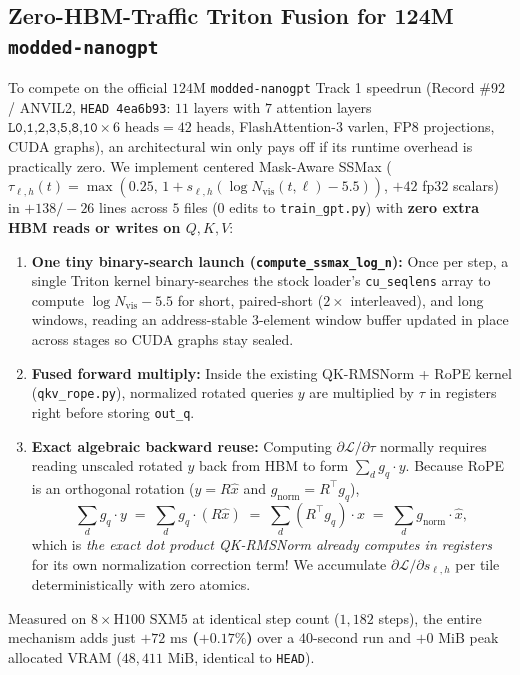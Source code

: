 \documentclass[10pt]{article}
\newcommand{\nvis}{N_{\mathrm{vis}}}
\begin{document}
\subsection{Zero-HBM-Traffic Triton Fusion for 124M \texttt{modded-nanogpt}}

To compete on the official $124\text{M}$ \texttt{modded-nanogpt} Track 1 speedrun (Record \#92 / ANVIL2, \texttt{HEAD 4ea6b93}: $11$ layers with $7$ attention layers $\texttt{L0,1,2,3,5,8,10} \times 6\text{ heads} = 42$ heads, FlashAttention-3 varlen, FP8 projections, CUDA graphs), an architectural win only pays off if its runtime overhead is practically zero. We implement centered Mask-Aware SSMax ($\tau_{\ell,h}(t) = \max(0.25,\, 1 + s_{\ell,h}(\log \nvis(t,\ell) - 5.5))$, $+42$ fp32 scalars) in $+138/-26$ lines across $5$ files ($0$ edits to \texttt{train\_gpt.py}) with \textbf{zero extra HBM reads or writes on $Q, K, V$}:
\begin{enumerate}[leftmargin=1.5em,itemsep=2pt,topsep=2pt]
  \item \textbf{One tiny binary-search launch (\texttt{compute\_ssmax\_log\_n}):} Once per step, a single Triton kernel binary-searches the stock loader's \texttt{cu\_seqlens} array to compute $\log\nvis - 5.5$ for short, paired-short ($2\times$ interleaved), and long windows, reading an address-stable $3$-element window buffer updated in place across stages so CUDA graphs stay sealed.
  \item \textbf{Fused forward multiply:} Inside the existing QK-RMSNorm + RoPE kernel (\texttt{qkv\_rope.py}), normalized rotated queries $y$ are multiplied by $\tau$ in registers right before storing \texttt{out\_q}.
  \item \textbf{Exact algebraic backward reuse:} Computing $\partial \mathcal{L} / \partial \tau$ normally requires reading unscaled rotated $y$ back from HBM to form $\sum_d g_q \cdot y$. Because RoPE is an orthogonal rotation ($y = R\hat{x}$ and $g_{\mathrm{norm}} = R^\top g_q$),
  \begin{equation}
    \sum_{d} g_q \cdot y \;=\; \sum_{d} g_q \cdot (R\hat{x}) \;=\; \sum_{d} (R^\top g_q) \cdot \hat{x} \;=\; \sum_{d} g_{\mathrm{norm}} \cdot \hat{x},
  \end{equation}
  which is \emph{the exact dot product QK-RMSNorm already computes in registers} for its own normalization correction term! We accumulate $\partial \mathcal{L} / \partial s_{\ell,h}$ per tile deterministically with zero atomics.
\end{enumerate}
Measured on $8\times\text{H100 SXM5}$ at identical step count ($1{,}182$ steps), the entire mechanism adds just \textbf{$+72\text{ ms}$ ($+0.17\%$)} over a $40$-second run and \textbf{$+0\text{ MiB}$} peak allocated VRAM ($48{,}411\text{ MiB}$, identical to \texttt{HEAD}).
\end{document}

